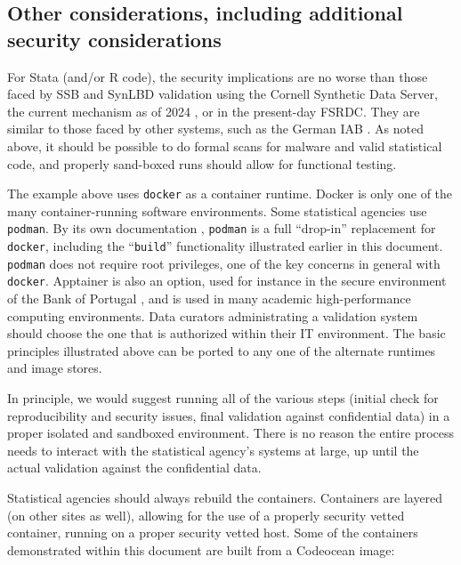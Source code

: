 \documentclass[inline]{hdsr}
\begin{document}
\subsection{Other considerations, including additional security considerations}

For Stata (and/or R code), the security implications are no worse than those  faced by \ac{SSB} and SynLBD validation using the Cornell Synthetic Data Server, the current mechanism as of 2024 \citep{u.s.censusbureauSIPPSyntheticBeta2015b,us_census_bureau_validating_2023}, or in the present-day \ac{FSRDC}. They are similar to those faced by other systems, such as the German IAB \citep{bender_research-data-centre_2011,muller_institute_2021}. As noted above, it should be possible to do formal scans for malware and valid statistical code, and properly sand-boxed runs should allow for functional testing.

The example above uses \texttt{docker} as a container runtime. Docker is only one of the many container-running software environments. Some statistical agencies use \texttt{podman}. By its own documentation , \texttt{podman} is a full ``drop-in'' replacement for  \texttt{docker}, including the ``\texttt{build}'' functionality illustrated earlier in this document. \texttt{podman} does not require root privileges, one of the key concerns in general with \texttt{docker}. Apptainer \citep{noauthor_apptainer_nodate} is also an option, used for instance in the secure environment of the Bank of Portugal \citep{guimaraes_reproducibility_2023}, and is used in many academic high-performance computing environments. Data curators administrating a validation system should choose the one that is authorized within their IT environment. The basic principles illustrated above can be ported to any one of the alternate runtimes and image stores.

In principle, we would suggest running all of the various steps (initial check for reproducibility and security issues, final validation against confidential data) in a proper isolated and sandboxed environment. There is no reason the entire process needs to interact with the statistical agency's systems at large, up until the actual validation against the confidential data.

Statistical agencies should always rebuild the containers. Containers are layered (on other sites as well), allowing for the use of a properly security vetted container, running on a proper security vetted host. Some of the containers demonstrated within this document are built from a Codeocean image:
\end{document}
